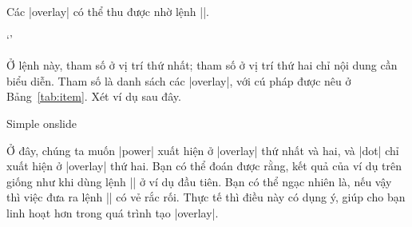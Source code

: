 \DescribeMacro{\onslide}
Các |overlay| có thể thu được nhờ lệnh |\onslide|.
\begin{command}
 `'
\end{command}
Ở lệnh này, tham số  ở vị trí thứ nhất;
tham số  ở vị trí thứ hai chỉ nội dung cần biểu diễn.
Tham số  là danh sách các |overlay|,
với cú pháp được nêu ở Bảng~\vref{tab:item}. Xét ví dụ sau đây.
\begin{example}
 \begin{slide}{Simple onslide}
 \end{slide}
\end{example}
Ở đây, chúng ta muốn |power| xuất hiện ở |overlay| thứ nhất và hai,
và |dot| chỉ xuất hiện ở |overlay| thứ hai. Bạn có thể đoán được rằng,
kết quả của ví dụ trên giống như khi dùng lệnh |\pause| ở ví dụ đầu tiên.
Bạn có thể ngạc nhiên là, nếu vậy thì việc đưa ra lệnh |\oneslide|
có vẻ rắc rối. Thực tế thì điều này có dụng ý, giúp cho bạn linh hoạt
hơn trong quá trình tạo |overlay|.

